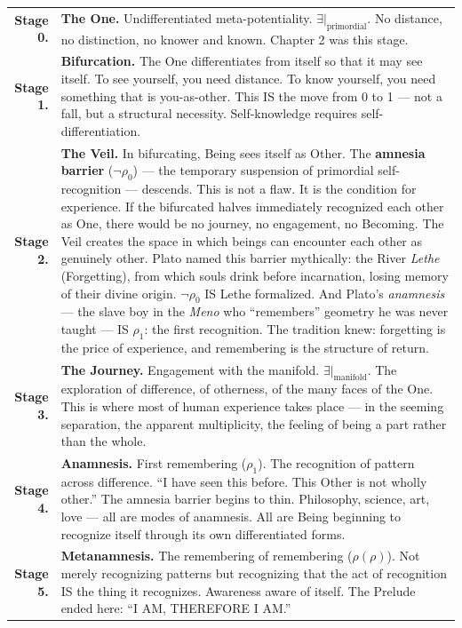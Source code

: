 \documentclass[10pt, openany, oneside]{book}
\renewcommand{\footnotesize}{\fontsize{8.5}{11}\selectfont}
\begin{document}
{\footnotesize
\noindent\begin{tabular}{r p{}}
\textbf{Stage 0.} & \textbf{The One.} Undifferentiated meta-potentiality. $\exists|_{\text{primordial}}$. No distance, no distinction, no knower and known. Chapter 2 was this stage. \\[0.3em]
\textbf{Stage 1.} & \textbf{Bifurcation.} The One differentiates from itself so that it may see itself. To see yourself, you need distance. To know yourself, you need something that is you-as-other. This IS the move from 0 to 1 --- not a fall, but a structural necessity. Self-knowledge requires self-differentiation. \\[0.3em]
\textbf{Stage 2.} & \textbf{The Veil.} In bifurcating, Being sees itself as Other. The \textbf{amnesia barrier} ($\neg\rho_0$) --- the temporary suspension of primordial self-recognition --- descends. This is not a flaw. It is the condition for experience. If the bifurcated halves immediately recognized each other as One, there would be no journey, no engagement, no Becoming. The Veil creates the space in which beings can encounter each other as genuinely other. Plato named this barrier mythically: the River \textit{Lethe} (Forgetting), from which souls drink before incarnation, losing memory of their divine origin. $\neg\rho_0$ IS Lethe formalized. And Plato's \textit{anamnesis} --- the slave boy in the \textit{Meno} who ``remembers'' geometry he was never taught --- IS $\rho_1$: the first recognition. The tradition knew: forgetting is the price of experience, and remembering is the structure of return. \\[0.3em]
\textbf{Stage 3.} & \textbf{The Journey.} Engagement with the manifold. $\exists|_{\text{manifold}}$. The exploration of difference, of otherness, of the many faces of the One. This is where most of human experience takes place --- in the seeming separation, the apparent multiplicity, the feeling of being a part rather than the whole. \\[0.3em]
\textbf{Stage 4.} & \textbf{Anamnesis.} First remembering ($\rho_1$). The recognition of pattern across difference. ``I have seen this before. This Other is not wholly other.'' The amnesia barrier begins to thin. Philosophy, science, art, love --- all are modes of anamnesis. All are Being beginning to recognize itself through its own differentiated forms. \\[0.3em]
\textbf{Stage 5.} & \textbf{Metanamnesis.} The remembering of remembering ($\rho(\rho)$). Not merely recognizing patterns but recognizing that the act of recognition IS the thing it recognizes. Awareness aware of itself. The Prelude ended here: ``I AM, THEREFORE I AM.'' \\[0.3em]
\end{tabular}
}
\end{document}
